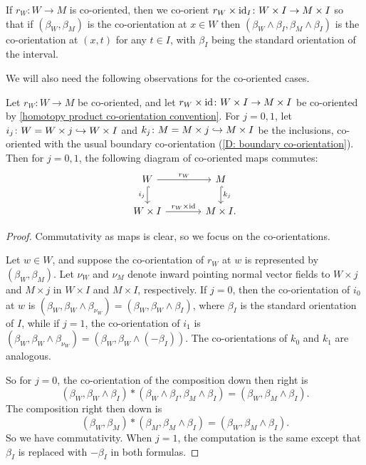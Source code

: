 \begin{convention}\label{homotopy product co-orientation convention}
	If $r_W \colon W \to M$ is co-oriented, then we co-orient $r_W \times \mathrm{id}_I \colon W \times I \to M \times I$ so that if $(\beta_W,\beta_M)$ is the co-orientation at $x \in W$ then $(\beta_W \wedge \beta_I,\beta_M \wedge \beta_I)$ is the co-orientation at $(x,t)$ for any $t \in I$, with $\beta_I$ being the standard orientation of the interval.
\end{convention}

We will also need the following observations for the co-oriented cases.

\begin{lemma}
	Let $r_W \colon W \to M$ be co-oriented, and let $r_W \times \mathrm{id} \colon W \times I \to M \times I$ be co-oriented by \cref{homotopy product co-orientation convention}.
	For $j = 0,1$, let $i_j \colon W = W \times j \hookrightarrow W \times I$ and $k_j \colon M = M \times j \hookrightarrow M \times I$ be the inclusions, co-oriented with the usual boundary co-orientation (\cref{D: boundary co-orientation}).
	Then for $j = 0,1$, the following diagram of co-oriented maps commutes:
	\[
	\begin{tikzcd}[column sep=large]
		W \arrow[r, "r_W"] \arrow[hookrightarrow,d, "i_j"'] & M \arrow[hookrightarrow,d, "k_j"] \\
		W \times I \arrow[r, "r_W \times \id"] & M \times I.
	\end{tikzcd}
	\]
\end{lemma}

\begin{proof}
	Commutativity as maps is clear, so we focus on the co-orientations.

	Let $w \in W$, and suppose the co-orientation of $r_W$ at $w$ is represented by $(\beta_W, \beta_M)$.
	Let $\nu_W$ and $\nu_M$ denote inward pointing normal vector fields to $W \times j$ and $M \times j$ in $W \times I$ and $M \times I$, respectively. If $j=0$, then the co-orientation of $i_0$ at $w$ is $(\beta_W, \beta_W \wedge \beta_{\nu_W}) = (\beta_W, \beta_W \wedge \beta_I)$, where $\beta_I$ is the standard orientation of $I$, while if $j=1$, the co-orientation of $i_1$ is $(\beta_W, \beta_W \wedge \beta_{\nu_W}) = (\beta_W, \beta_W \wedge (-\beta_I))$. The co-orientations of $k_0$ and $k_1$ are analogous.

	So for $j=0$, the co-orientation of the composition down then right is $$(\beta_W, \beta_W \wedge \beta_I) * (\beta_W \wedge \beta_I, \beta_M \wedge \beta_I) = (\beta_W, \beta_M \wedge \beta_I).$$
	The composition right then down is $$(\beta_W, \beta_M) * (\beta_M, \beta_M \wedge \beta_I) = (\beta_W , \beta_M \wedge \beta_I).$$
	So we have commutativity.
	When $j=1$, the computation is the same except that $\beta_I$ is replaced with $-\beta_I$ in both formulas.
\end{proof}

